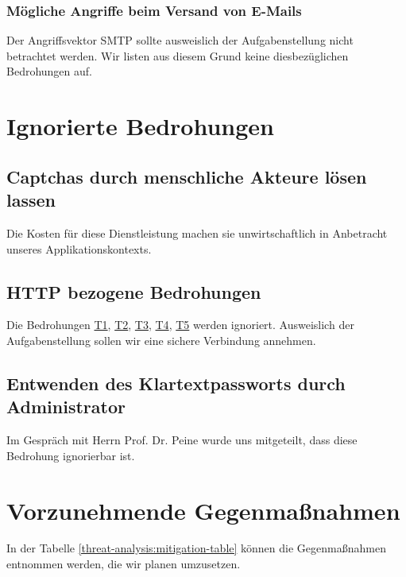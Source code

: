 \documentclass[12pt,DIV14,BCOR10mm,a4paper,parskip=half-,headsepline,headinclude,english,ngerman,bibliography=totocnumbered]{scrreprt}
\begin{document}
\subsubsection{Mögliche Angriffe beim Versand von E-Mails}
Der Angriffsvektor SMTP sollte ausweislich der Aufgabenstellung nicht betrachtet werden. Wir listen aus diesem Grund keine diesbezüglichen Bedrohungen auf.

\newcommand{\linktothreat}[2]{\texorpdfstring{\protect\hyperlink{#1}{#2}}{}}%

\section{Ignorierte Bedrohungen}
\subsection{Captchas durch menschliche Akteure lösen lassen}
Die Kosten für diese Dienstleistung machen sie unwirtschaftlich in Anbetracht unseres Applikationskontexts.

\subsection{HTTP bezogene Bedrohungen}
Die Bedrohungen \linktothreat{threat1}{T1}, \linktothreat{threat2}{T2}, \linktothreat{threat3}{T3}, \linktothreat{threat4}{T4}, \linktothreat{threat5}{T5} werden ignoriert.
Ausweislich der Aufgabenstellung sollen wir eine sichere Verbindung annehmen.

\subsection{Entwenden des Klartextpassworts durch Administrator}
Im Gespräch mit Herrn Prof. Dr. Peine wurde uns mitgeteilt, dass diese Bedrohung ignorierbar ist.

\section{Vorzunehmende Gegenmaßnahmen}

In der Tabelle \ref{threat-analysis:mitigation-table} können die Gegenmaßnahmen entnommen werden, die wir planen umzusetzen.
\end{document}
